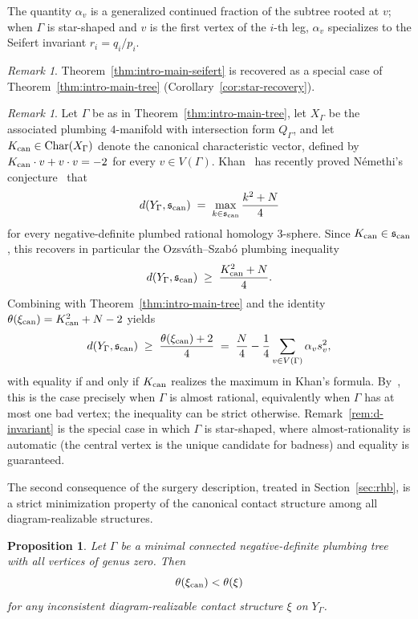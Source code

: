 \documentclass[11pt]{amsart}
\theoremstyle{plain}
\newtheorem{proposition}[theorem]{Proposition}
\theoremstyle{definition}
\theoremstyle{remark}
\newtheorem{remark}[theorem]{Remark}
\begin{document}
The quantity $\alpha_v$ is a generalized continued fraction of the
subtree rooted at $v$; when $\Gamma$ is star-shaped and $v$ is the
first vertex of the $i$-th leg, $\alpha_v$ specializes to the Seifert
invariant $r_i=q_i/p_i$.  

\begin{remark}\label{rem:intro-non-minimal-extension}
Theorem~\ref{thm:intro-main-seifert} is recovered as a special case
of Theorem~\ref{thm:intro-main-tree}
(Corollary~\ref{cor:star-recovery}).
\end{remark}

\begin{remark}\label{rem:d-invariant-tree}
Let $\Gamma$ be as in Theorem~\ref{thm:intro-main-tree}, let
$X_\Gamma$ be the associated plumbing $4$-manifold with intersection
form $Q_\Gamma$, and let $K_{\rm can}\in\operatorname{Char}(X_\Gamma)$
denote the canonical characteristic vector, defined by
$K_{\rm can}\cdot v + v\cdot v = -2$ for every $v\in V(\Gamma)$.
Khan~\cite{Khan2026} has recently proved N\'emethi's
conjecture~\cite{Nemethi2008} that
\[
d(Y_\Gamma,\mathfrak{s}_{\rm can})
\;=\;
\max_{k\in\mathfrak{s}_{\rm can}}\frac{k^2+N}{4}
\]
for every negative-definite plumbed rational homology 3-sphere.
Since $K_{\rm can}\in\mathfrak{s}_{\rm can}$, this recovers in
particular the Ozsv\'ath--Szab\'o plumbing
inequality~\cite[Theorem~9.6]{OzsvathSzabo2003abs}
\[
d(Y_\Gamma,\mathfrak{s}_{\rm can})
\;\geq\;
\frac{K_{\rm can}^2+N}{4}.
\]
Combining with Theorem~\ref{thm:intro-main-tree} and the identity
$\theta(\xi_{\rm can})=K_{\rm can}^2+N-2$
\cite[Remark~4.8]{NemethiNicolaescu2002} yields
\[
d(Y_\Gamma,\mathfrak{s}_{\rm can})
\;\geq\;
\frac{\theta(\xi_{\rm can})+2}{4}
\;=\;
\frac{N}{4}-\frac{1}{4}\sum_{v\in V(\Gamma)}\alpha_v s_v^2,
\]
with equality if and only if $K_{\rm can}$ realizes the maximum in
Khan's formula. By~\cite{Nemethi2005}, this is the case precisely
when $\Gamma$ is almost rational, equivalently when $\Gamma$ has at
most one bad vertex; the inequality can be strict otherwise.
Remark~\ref{rem:d-invariant} is the special case in which $\Gamma$ is
star-shaped, where almost-rationality is automatic (the central
vertex is the unique candidate for badness) and equality is
guaranteed.
\end{remark}

The second consequence of the surgery description, treated in
Section~\ref{sec:rhb}, is a strict minimization property of the
canonical contact structure among all diagram-realizable structures.

\begin{proposition}\label{prop:min}
Let $\Gamma$ be a minimal connected negative-definite plumbing tree
with all vertices of genus zero. Then
\[
\theta(\xi_{\rm can})<\theta(\xi)
\]
for any inconsistent diagram-realizable contact structure $\xi$ on
$Y_\Gamma$.
\end{proposition}
\end{document}
